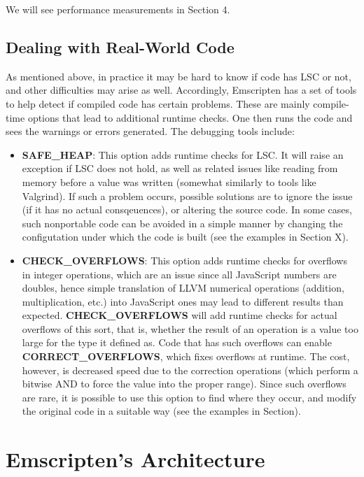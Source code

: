 \documentclass[11pt]{proc}
\begin{document}
We will see performance measurements in Section 4.

\subsection{Dealing with Real-World Code}

As mentioned above, in practice it may be hard to know if code has LSC or not,
and other difficulties may arise as well. Accordingly, Emscripten has a set of
tools to help detect if compiled code has certain problems. These are mainly
compile-time options that lead to additional runtime checks. One then runs
the code and sees the warnings or errors generated. The debugging tools include:
\begin{itemize}
\item \textbf{SAFE\_HEAP}: This option adds runtime checks for LSC. It will
      raise an exception if LSC does not hold, as well as related issues like
      reading from memory before a value was written (somewhat similarly to tools
      like Valgrind). If such a problem
      occurs, possible solutions are to ignore the issue (if it has no actual
      consqeuences), or altering the source code. In
      some cases, such nonportable code can be avoided in a simple manner by changing the configutation under
      which the code is built (see the examples in Section X).
\item \textbf{CHECK\_OVERFLOWS}: This option adds runtime checks for overflows in integer operations,
      which are an issue since all JavaScript numbers are doubles, hence simple translation
      of LLVM numerical operations (addition, multiplication, etc.) into JavaScript ones may lead
      to different results than expected. \textbf{CHECK\_OVERFLOWS} will add runtime checks for
      actual overflows of this sort, that is, whether the result of an operation is a value too large for the type it defined as.
      Code that has such overflows can enable \textbf{CORRECT\_OVERFLOWS}, which fixes overflows at
      runtime. The cost, however, is decreased speed due to the correction operations (which perform
      a bitwise AND to force the value into the proper range). Since such
      overflows are rare, it is possible to use this option to find where they
      occur, and modify the original code in a suitable way (see the examples in Section).
\end{itemize}

\section{Emscripten's Architecture}
\end{document}
